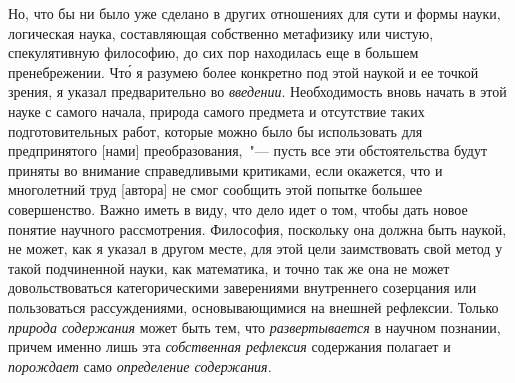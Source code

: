 Но, что бы ни было уже сделано в других отношениях
для сути и формы науки, логическая наука, составляющая
собственно метафизику или чистую, спекулятивную
философию, до сих пор находилась еще в большем
пренебрежении. Чт\'о я разумею более конкретно под этой
наукой и ее точкой зрения, я указал предварительно во
\emph{введении}. Необходимость вновь начать в этой науке с
самого начала, природа самого предмета и отсутствие таких
подготовительных работ, которые можно было бы
использовать для предпринятого [нами] преобразования,~"---
пусть все эти обстоятельства будут приняты во внимание
справедливыми критиками, если окажется, что и многолетний
труд [автора] не смог сообщить этой попытке
большее совершенство. Важно иметь в виду, что дело
идет о том, чтобы дать новое понятие научного рассмотрения.
Философия, поскольку она должна быть наукой,
не может, как я указал в другом
месте\footnotemark{},
для этой цели
заимствовать свой метод у такой подчиненной науки, как
математика, и точно так же она не может довольствоваться
категорическими заверениями внутреннего созерцания
или пользоваться рассуждениями, основывающимися
на внешней рефлексии. Только \emph{природа содержания}
может быть тем, что \emph{развертывается} в научном познании,
причем именно лишь эта \emph{собственная рефлексия} содержания
полагает и \emph{порождает} само \emph{определение содержания}\endnotemark{}.




